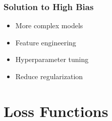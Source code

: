 \documentclass{article}
\begin{document}
\subsubsection{Solution to High Bias}
\begin{definition}
    \begin{itemize}
        \item More complex models
        \item Feature engineering
        \item Hyperparameter tuning
        \item Reduce regularization
    \end{itemize}
\end{definition}
\newpage

\section{Loss Functions}
\end{document}
